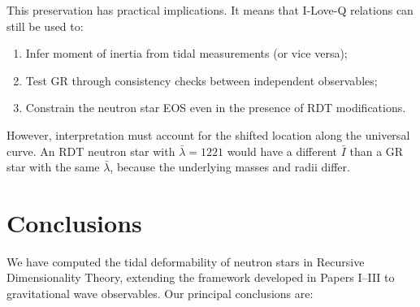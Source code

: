 \documentclass[twocolumn,showpacs,preprintnumbers,amsmath,amssymb,prd]{revtex4-2}
\begin{document}
This preservation has practical implications. It means that I-Love-Q relations can still be used to:
\begin{enumerate}
\item Infer moment of inertia from tidal measurements (or vice versa);
\item Test GR through consistency checks between independent observables;
\item Constrain the neutron star EOS even in the presence of RDT modifications.
\end{enumerate}

However, interpretation must account for the shifted location along the universal curve. An RDT neutron star with $\bar{\lambda} = 1221$ would have a different $\bar{I}$ than a GR star with the same $\bar{\lambda}$, because the underlying masses and radii differ.


\section{Conclusions}
\label{sec:conclusions}

We have computed the tidal deformability of neutron stars in Recursive Dimensionality Theory, extending the framework developed in Papers I--III to gravitational wave observables. Our principal conclusions are:
\end{document}
